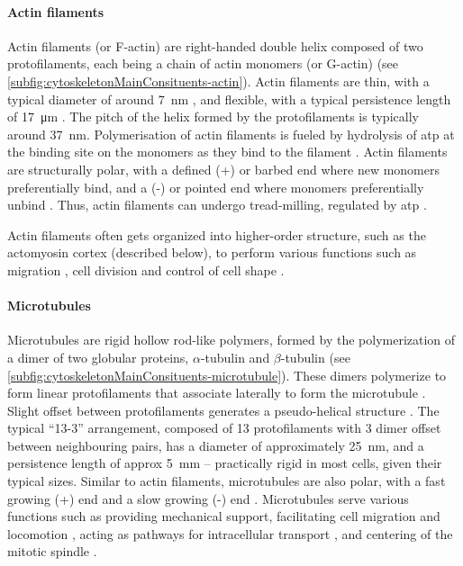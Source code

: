 \paragraph{Actin filaments}
Actin filaments (or F-actin) are right-handed double helix composed of two protofilaments, each being a chain of actin monomers (or G-actin) \citep{pollard1986actin,pollard2000molecular} (see \autoref{subfig:cytoskeletonMainConsituents-actin}). Actin filaments are thin, with a typical diameter of around \SI{7}{\nano\meter} \citep{cooper2007cell}, and flexible, with a typical persistence length of \SI{17}{\micro\meter} \citep{ott1993measurement,gittes1993flexural}. The pitch of the helix formed by the protofilaments is typically around \SI{37}{\nano\meter}. Polymerisation of actin filaments is fueled by hydrolysis of \ac{atp} at the binding site on the monomers as they bind to the filament \citep{fujiwara2007polymerization}. Actin filaments are structurally polar, with a defined (+) or barbed end where new monomers preferentially bind, and a (-) or pointed end where monomers preferentially unbind \citep{pollard1986actin,pollard2000molecular,vavylonis2005actin}. Thus, actin filaments can undergo tread-milling, regulated by \ac{atp} \citep{wegner1982treadmilling}.

Actin filaments often gets organized into higher-order structure, such as the actomyosin cortex (described below), to perform various functions such as migration \citep{pollard2003cellular}, cell division \citep{sanger1975changing} and control of cell shape \citep{clarke1977nonmuscle}. 

\paragraph{Microtubules}
Microtubules are rigid hollow rod-like polymers, formed by the polymerization of a dimer of two globular proteins, $\alpha$-tubulin and $\beta$-tubulin \citep{chaffey2003alberts,nogales1998structure} (see \autoref{subfig:cytoskeletonMainConsituents-microtubule}). These dimers polymerize to form linear protofilaments that associate laterally to form the microtubule \citep{chaffey2003alberts}. Slight offset between protofilaments generates a pseudo-helical structure \citep{hunyadi2007microtubule}. The typical \enquote{\num{13}-\num{3}} arrangement, composed of \num{13} protofilaments with \num{3} dimer offset between neighbouring pairs, has a diameter of approximately \SI{25}{\nano\meter}, and a persistence length of approx \SI{5}{\milli\meter} \citep{chalfie1979organization,chaffey2003alberts,gittes1993flexural,ledbetter1963microtubule} -- practically rigid in most cells, given their typical sizes. Similar to actin filaments, microtubules are also polar, with a fast growing (+) end and a slow growing (-) end \citep{howard2003dynamics}. Microtubules serve various functions such as providing mechanical support, facilitating cell migration and locomotion \citep{mikhailov1998relationship}, acting as pathways for intracellular transport \citep{chaffey2003alberts}, and centering of the mitotic spindle \citep{pearson2004dynamic,grill2003distribution,grill2005theory}.

